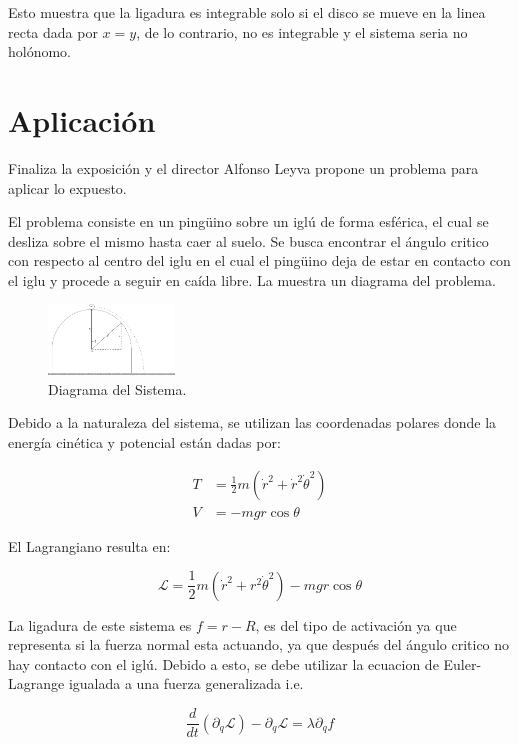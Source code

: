 \documentclass{article}
\theoremstyle{definition}
\begin{document}
Esto muestra que la ligadura es integrable solo si el disco se mueve en la linea recta dada por $x = y$, de lo contrario, no es integrable y el sistema seria no holónomo.

\section{Aplicación}
Finaliza la exposición y el director Alfonso Leyva propone un problema para aplicar lo expuesto.

El problema consiste en un pingüino sobre un iglú de forma esférica, el cual se desliza sobre el mismo hasta caer al suelo. Se busca encontrar el ángulo critico con respecto al centro del iglu en el cual el pingüino deja de estar en contacto con el iglu y procede a seguir en caída libre. La  muestra un diagrama del problema.

\begin{figure}[H]
	\centering
	\includegraphics[width=0.3\textwidth]{./Images/iglu.pdf}
	\caption{Diagrama del Sistema.}
	\label{fig:iglú}
\end{figure}

Debido a la naturaleza del sistema, se utilizan las coordenadas polares donde la energía cinética y potencial están dadas por:

\begin{align}
	T &= \frac{1}{2} m \left(\dot{r}^2 + \dot{r}^2 \dot{\theta}^2 \right) \\
	V &= -mgr\cos{\theta}
\end{align}

El Lagrangiano resulta en:

\begin{equation}
	\mathcal{L} = \frac{1}{2}m \left(\dot{r}^2 + r^2\dot{\theta}^2 \right) - mgr\cos{\theta}
\end{equation}

La ligadura de este sistema es $f = r - R$, es del tipo de activación ya que representa si la fuerza normal esta actuando, ya que después del ángulo critico no hay contacto con el iglú. Debido a esto, se debe utilizar la ecuacion de Euler-Lagrange igualada a una fuerza generalizada i.e.

\begin{equation}
	\frac{d}{dt}\left(\partial_{\dot{q}} \mathcal{L}\right) - \partial_q \mathcal{L} = \lambda \partial_{q}f
\end{equation}
\end{document}
